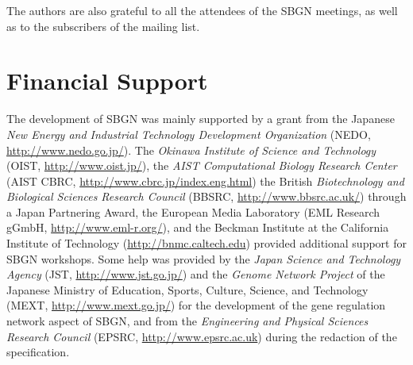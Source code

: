 The authors are also grateful to all the attendees of the SBGN meetings, as well as to the subscribers of the  mailing list.

\section{Financial Support}

The development of SBGN was mainly supported by a grant from the Japanese \emph{New Energy and Industrial Technology Development Organization} (NEDO, \url{http://www.nedo.go.jp/}).  The \emph{Okinawa Institute of Science and Technology} (OIST, \url{http://www.oist.jp/}), the \emph{AIST Computational Biology Research Center} (AIST CBRC, \url{http://www.cbrc.jp/index.eng.html}) the British \emph{Biotechnology and Biological Sciences Research Council} (BBSRC, \url{http://www.bbsrc.ac.uk/}) through a Japan Partnering Award, the European Media Laboratory (EML Research gGmbH, \url{http://www.eml-r.org/}), and the Beckman Institute at the California Institute of Technology (\url{http://bnmc.caltech.edu}) provided additional support for SBGN workshops.  Some help was provided by the \emph{Japan Science and Technology Agency} (JST, \url{http://www.jst.go.jp/}) and the \emph{Genome Network Project} of the Japanese Ministry of Education, Sports, Culture, Science, and Technology (MEXT, \url{http://www.mext.go.jp/}) for the development of the gene regulation network aspect of SBGN, and from the \emph{Engineering and Physical Sciences Research Council} (EPSRC, \url{http://www.epsrc.ac.uk}) during the redaction of the specification.